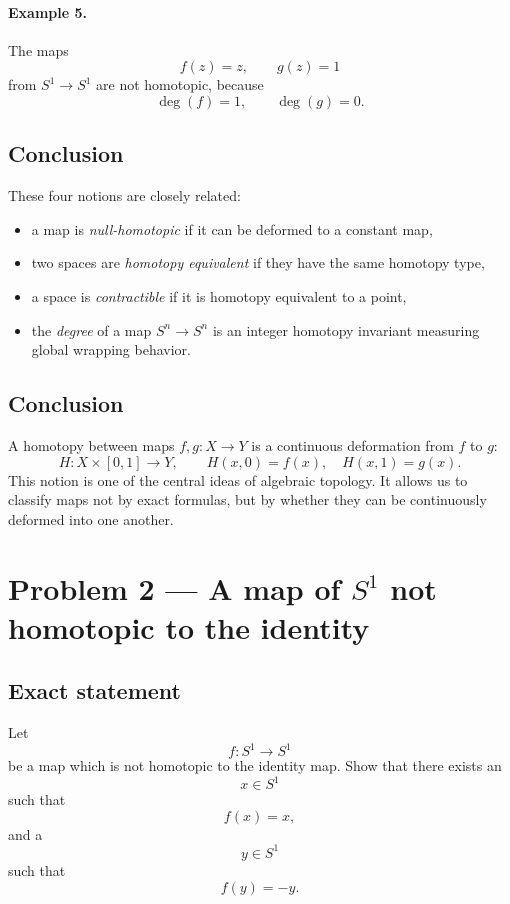 \documentclass[12pt,a4paper]{article}
\theoremstyle{notespace}
\begin{document}
\paragraph{Example 5.}
The maps
\[
f(z)=z,\qquad g(z)=1
\]
from \(S^1\to S^1\) are not homotopic, because
\[
\deg(f)=1,\qquad \deg(g)=0.
\]

\subsection{Conclusion}

These four notions are closely related:

\begin{itemize}
	\item a map is \emph{null-homotopic} if it can be deformed to a constant map,
	\item two spaces are \emph{homotopy equivalent} if they have the same homotopy type,
	\item a space is \emph{contractible} if it is homotopy equivalent to a point,
	\item the \emph{degree} of a map \(S^n\to S^n\) is an integer homotopy invariant measuring global wrapping behavior.
\end{itemize}

\subsection{Conclusion}

A homotopy between maps \(f,g:X\to Y\) is a continuous deformation from \(f\) to \(g\):
\[
H:X\times[0,1]\to Y,
\qquad
H(x,0)=f(x),\quad H(x,1)=g(x).
\]
This notion is one of the central ideas of algebraic topology. It allows us to classify maps not by exact formulas, but by whether they can be continuously deformed into one another.	
	
	
\section{Problem 2 --- A map of \(S^1\) not homotopic to the identity}

\subsection{Exact statement}

Let
\[
f:S^1\to S^1
\]
be a map which is not homotopic to the identity map. Show that there exists an
\[
x\in S^1
\]
such that
\[
f(x)=x,
\]
and a
\[
y\in S^1
\]
such that
\[
f(y)=-y.
\]
\end{document}
